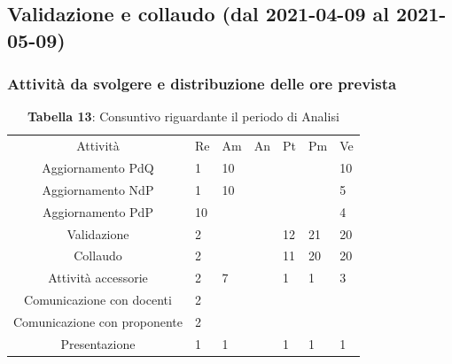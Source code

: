 \subsection{Validazione e collaudo (dal 2021-04-09 al 2021-05-09)}


\subsubsection{Attività da svolgere e distribuzione delle ore prevista}
\begin{table}[H]
	\centering
	\renewcommand{\arraystretch}{1.5}
	\begin{tabular}{|c|p{10mm}|p{10mm}|p{10mm}|p{10mm}|p{10mm}|p{10mm}|}
		\hline
		\rowcolor{lighter-grayer}
		Attività & Re & Am & An & Pt & Pm & Ve \\
		Aggiornamento PdQ          & 1  & 10 &  &    &    & 10 \\
		Aggiornamento NdP          & 1  & 10 &  &    &    & 5  \\
		Aggiornamento PdP          & 10 &    &  &    &    & 4  \\
		Validazione                & 2  &    &  & 12 & 21 & 20 \\
		Collaudo                   & 2  &    &  & 11 & 20 & 20 \\
		Attività accessorie 	   & 2  & 7  &  & 1  & 1  & 3  \\
		Comunicazione con docenti  & 2  &    &  &    &    &    \\
		Comunicazione con proponente& 2  &    &  &    &    &    \\
		Presentazione              & 1  & 1  &  & 1  & 1  & 1 \\
		\hline
	\end{tabular}
	\caption*{\textbf{Tabella 13}: Consuntivo riguardante il periodo di Analisi\\}
\end{table}